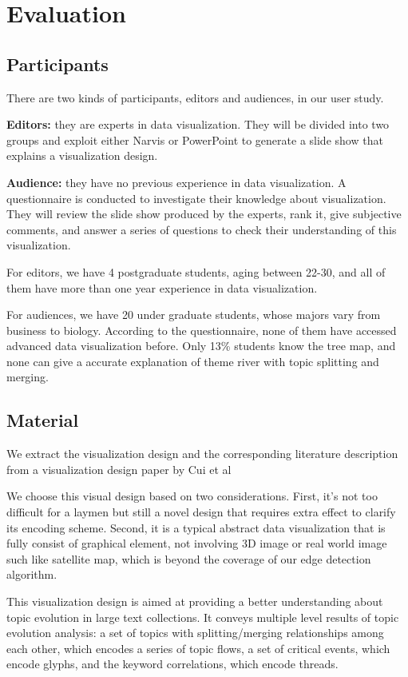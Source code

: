 \documentclass[review,journal]{vgtc}         %
\begin{document}
\section{Evaluation}
\subsection{Participants}
There are two kinds of participants, editors and audiences,  in our user study.\par 
\textbf{Editors: }they are experts in data visualization. They will be divided into two groups and exploit either Narvis or PowerPoint to generate a slide show that explains a visualization design.  \par
\textbf{Audience: }they have no previous experience in data visualization. A questionnaire is conducted to investigate their knowledge about visualization. They will review the slide show produced by the experts, rank it, give subjective comments, and answer a series of questions to check their understanding of this visualization.\par
For editors, we have 4 postgraduate students, aging between 22-30, and all of them have more than one year experience in data visualization.\par
For audiences, we have 20 under graduate students, whose majors vary from business to biology. According to the questionnaire, none of them have accessed advanced data visualization before. Only 13\% students know the tree map, and none can give a accurate explanation of theme river with topic splitting and merging.  \par
\subsection{Material}
We extract the visualization design and the corresponding literature description from  a visualization design paper by Cui et al\cite{cui_textflow:_2011} \par
We choose this visual design based on two considerations. First, it's not too difficult for a laymen but still a novel design that requires extra effect to clarify its encoding scheme.
Second, it is a typical abstract data visualization that is fully consist of graphical element, not involving 3D image or real world image such like satellite map, which is beyond the coverage of our edge detection algorithm. \par
This visualization design is aimed at providing a better understanding about topic evolution in large text collections. It conveys multiple level results of topic evolution analysis: a set of topics
with splitting/merging relationships among each other, which encodes a series of topic flows, a set of critical events, which encode glyphs, and the keyword correlations, which encode threads.  \par
\end{document}
